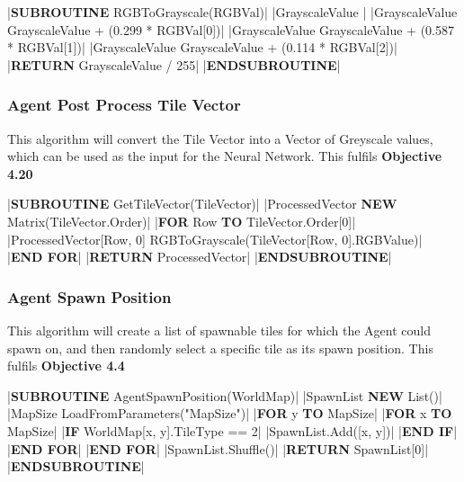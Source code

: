 \begin{flushleft}
                \vspace{0.2cm}
                \begin{pseudocode}
|\textbf{SUBROUTINE} RGBToGrayscale(RGBVal)|
    |GrayscaleValue |
    |GrayscaleValue \leftarrow GrayscaleValue + (0.299 * RGBVal[0])|
    |GrayscaleValue \leftarrow GrayscaleValue + (0.587 * RGBVal[1])|
    |GrayscaleValue \leftarrow GrayscaleValue + (0.114 * RGBVal[2])|
    |\textbf{RETURN} GrayscaleValue / 255|
|\textbf{ENDSUBROUTINE}|
                \end{pseudocode}

                \vspace{0.5cm}
            \subsubsection{Agent Post Process Tile Vector}
                This algorithm will convert the Tile Vector into a Vector of Greyscale values, which can be used as the input for the Neural
                Network. This fulfils \textbf{Objective 4.20}

                \vspace{0.2cm}
                \begin{pseudocode}
|\textbf{SUBROUTINE} GetTileVector(TileVector)|
    |ProcessedVector \leftarrow \textbf{NEW} Matrix(TileVector.Order)|
    |\textbf{FOR} Row  \textbf{TO} TileVector.Order[0]|
        |ProcessedVector[Row, 0] \leftarrow RGBToGrayscale(TileVector[Row, 0].RGBValue)|
    |\textbf{END FOR}|
    |\textbf{RETURN} ProcessedVector|
|\textbf{ENDSUBROUTINE}|
                \end{pseudocode}
                
                \vspace{0.5cm}
            \subsubsection{Agent Spawn Position}
                This algorithm will create a list of spawnable tiles for which the Agent could spawn on, and then randomly select a specific
                tile as its spawn position. This fulfils \textbf{Objective 4.4}

                \vspace{0.2cm}
                \begin{pseudocode}
|\textbf{SUBROUTINE} AgentSpawnPosition(WorldMap)|
    |SpawnList \leftarrow \textbf{NEW} List()|
    |MapSize \leftarrow LoadFromParameters("MapSize")|
    |\textbf{FOR} y  \textbf{TO} MapSize|
        |\textbf{FOR} x  \textbf{TO} MapSize|
            |\textbf{IF} WorldMap[x, y].TileType == 2|
                |SpawnList.Add([x, y])|
            |\textbf{END IF}|
        |\textbf{END FOR}|
    |\textbf{END FOR}|
    |SpawnList.Shuffle()|
    |\textbf{RETURN} SpawnList[0]|
|\textbf{ENDSUBROUTINE}|
                \end{pseudocode}


\end{flushleft}
